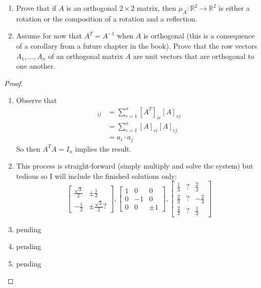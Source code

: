 \begin{exercise}
\begin{enumerate}
        \item Prove that if \( A \) is an orthogonal \( 2 \times 2 \) matrix, then \( \mu_A: \mathbb{R}^2 \rightarrow \mathbb{R}^2 \) is either a rotation or the composition of a rotation and a reflection.
        
        \item Assume for now that \( A^T = A^{-1} \) when \( A \) is orthogonal (this is a consequence of a corollary from a future chapter in the book). Prove that the row vectors \( A_1, \ldots, A_n \) of an orthogonal matrix \( A \) are unit vectors that are orthogonal to one another.
    \end{enumerate}
    
    \begin{proof}
        \begin{enumerate}
            \item Observe that
            \begin{align*}
                [A^TA]_{ij} &= \sum_{r=1}^n [A^T]_{ir} [A]_{rj} \\
                &= \sum_{r=1}^n [A]_{ri} [A]_{rj} \\
                &= a_i \cdot a_j
            \end{align*}
            So then \( A^TA = I_n \) implies the result.
            \item This process is straight-forward (simply multiply and solve the system) but tedious so I will include the finished solutions only:
            \[
                \begin{bmatrix}
                    \frac{\sqrt{3}}{2} & \pm \frac{1}{2} \\ 
                    -\frac{1}{2} & \pm \frac{\sqrt{3}}{2}? 
                \end{bmatrix},
                \begin{bmatrix}
                    1 & 0 & 0 \\ 
                    0 & -1 & 0 \\ 
                    0 & 0 & \pm 1
                \end{bmatrix},
                \begin{bmatrix}
                    \frac{1}{3} & ? & \frac{2}{3} \\
                    \frac{2}{3} & ? & -\frac{2}{3} \\
                    \frac{2}{3} & ? & \frac{1}{3}
                \end{bmatrix}
            \]
            
            \item pending
            
            \item pending
            
            \item pending
        \end{enumerate}
    \end{proof}
\end{exercise} %

